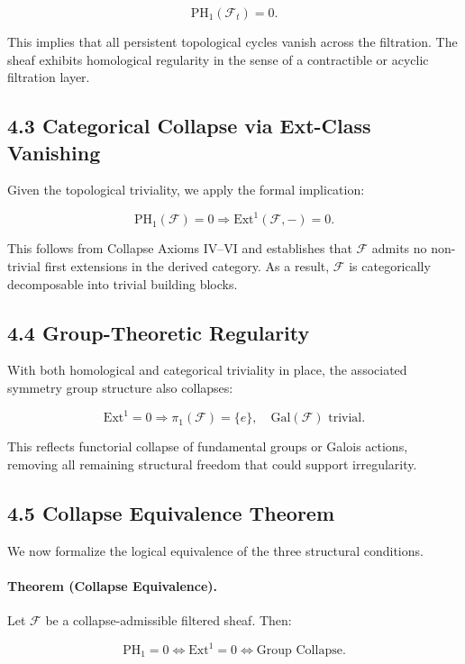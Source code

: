 \documentclass[11pt]{article}
\begin{document}
\[
\mathrm{PH}_1(\mathcal{F}_t) = 0.
\]

This implies that all persistent topological cycles vanish across the filtration. The sheaf exhibits homological regularity in the sense of a contractible or acyclic filtration layer.

\subsection*{4.3 Categorical Collapse via Ext-Class Vanishing}

Given the topological triviality, we apply the formal implication:

\[
\mathrm{PH}_1(\mathcal{F}) = 0 \Rightarrow \mathrm{Ext}^1(\mathcal{F}, -) = 0.
\]

This follows from Collapse Axioms IV–VI and establishes that \( \mathcal{F} \) admits no non-trivial first extensions in the derived category. As a result, \( \mathcal{F} \) is categorically decomposable into trivial building blocks.

\subsection*{4.4 Group-Theoretic Regularity}

With both homological and categorical triviality in place, the associated symmetry group structure also collapses:

\[
\mathrm{Ext}^1 = 0 \Rightarrow \pi_1(\mathcal{F}) = \{e\}, \quad \mathrm{Gal}(\mathcal{F}) \text{ trivial}.
\]

This reflects functorial collapse of fundamental groups or Galois actions, removing all remaining structural freedom that could support irregularity.

\subsection*{4.5 Collapse Equivalence Theorem}

We now formalize the logical equivalence of the three structural conditions.

\paragraph{Theorem (Collapse Equivalence).}
Let \( \mathcal{F} \) be a collapse-admissible filtered sheaf. Then:

\[
\mathrm{PH}_1 = 0 \iff \mathrm{Ext}^1 = 0 \iff \text{Group Collapse}.
\]
\end{document}
